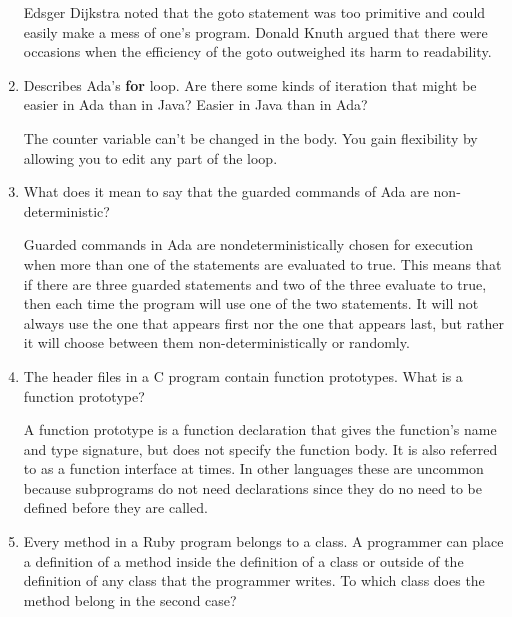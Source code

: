 \begin{enumerate}
\begin{answer}
 Edsger Dijkstra noted that the goto statement was too primitive and could
easily make a mess of one's program.  Donald Knuth argued that there were
occasions when the efficiency of the goto outweighed its harm to readability.

    \end{answer}


  \item Describes Ada's \textbf{for} loop. Are there some
    kinds of iteration that might be easier in Ada than
    in Java? Easier in Java than in Ada?

  \begin{answer}

    The counter variable can't be changed in the body.  You gain flexibility by
allowing you to edit any part of the loop.

    \end{answer}

  \item What does it mean to say that the guarded commands
    of Ada are non-deterministic?

 \begin{answer}

Guarded commands in Ada are nondeterministically chosen for execution when more than
 one of the statements are evaluated to true. This means that if there are three
 guarded statements and two of the three evaluate to true, then each time the
 program will use one of the two statements. It will not always use the one that
 appears first nor the one that appears last, but rather it will choose between them
 non-deterministically or randomly.
    \end{answer}

  \item The header files in a C program contain function
    prototypes. What is a function prototype?

\begin{answer}

A function prototype is a function declaration that gives the function's name and
 type signature, but does not specify the function body. It is also referred to as
 a function interface at times. In other languages these are uncommon because
 subprograms do not need declarations since they do no need to be defined before
 they are called. 
    \end{answer}

  \item Every method in a Ruby program belongs to a class.
    A programmer can place a definition of a method inside
    the definition of a class or outside of the definition
    of any class that the programmer writes. To which class
    does the method belong in the second case?


\end{enumerate}
